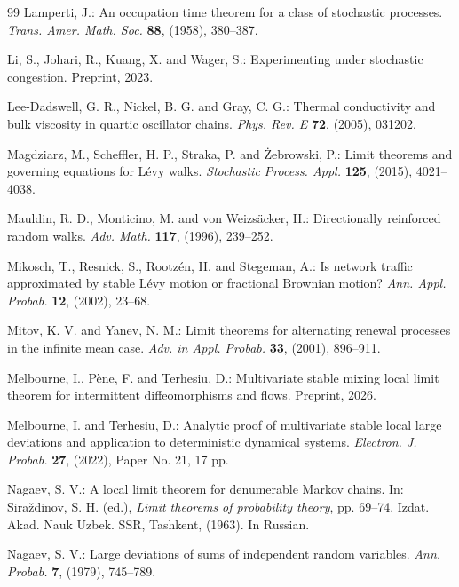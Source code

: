 \documentclass[EJP,preprint]{ejpecp}
\theoremstyle{ejpecpbodyit}
\begin{document}
\begin{thebibliography}{99}
 Lamperti, J.: An occupation time theorem for a class of
  stochastic processes. \emph{Trans. Amer. Math. Soc.} \textbf{88}, (1958),
  380--387. 

 Li, S., Johari, R., Kuang, X. and Wager, S.: Experimenting under
  stochastic congestion. Preprint, 2023. 

 Lee-Dadswell, G. R., Nickel, B. G. and Gray, C. G.: Thermal
  conductivity and bulk viscosity in quartic oscillator chains. \emph{Phys.
  Rev. E} \textbf{72}, (2005), 031202.

 Magdziarz, M., Scheffler, H. P., Straka, P. and
  \.Zebrowski, P.: Limit theorems and governing equations for L\'evy walks.
  \emph{Stochastic Process. Appl.} \textbf{125}, (2015), 4021--4038.

 Mauldin, R. D., Monticino, M. and von Weizs\"acker, H.:
  Directionally reinforced random walks. \emph{Adv. Math.} \textbf{117},
  (1996), 239--252. 

 Mikosch, T., Resnick, S., Rootz\'en, H. and Stegeman, A.: Is network
  traffic approximated by stable L\'evy motion or fractional Brownian motion? \emph{Ann.
  Appl. Probab.} \textbf{12}, (2002), 23--68. 

 Mitov, K. V. and Yanev, N. M.: Limit theorems for alternating
  renewal processes in the infinite mean case. \emph{Adv. in Appl. Probab.} \textbf{33},
  (2001), 896--911. 

 Melbourne, I., P\`ene, F. and Terhesiu, D.: Multivariate
  stable mixing local limit theorem for intermittent diffeomorphisms and
  flows. Preprint, 2026. 

 Melbourne, I. and Terhesiu, D.: Analytic proof
  of multivariate stable local large deviations and application to
  deterministic dynamical systems. \emph{Electron. J. Probab.} \textbf{27},
  (2022), Paper No. 21, 17 pp. 

 Nagaev, S. V.: A local limit theorem for denumerable Markov
  chains. In: Sira\v{z}dinov, S. H. (ed.), \emph{Limit theorems of probability
  theory}, pp. 69--74. Izdat. Akad. Nauk Uzbek. SSR, Tashkent, (1963). In Russian.

 Nagaev, S. V.: Large deviations of sums of independent
  random variables. \emph{Ann. Probab.} \textbf{7}, (1979), 745--789.


\end{thebibliography}
\end{document}
